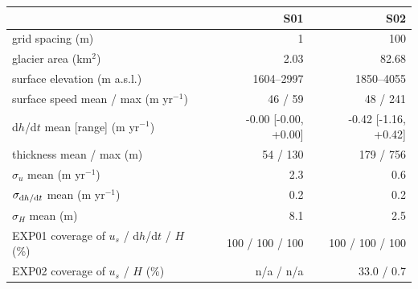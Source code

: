 \begin{tabular}{lrr}
\toprule
 & S01 & S02 \\
\midrule
grid spacing (m) & 1 & 100 \\
glacier area (km$^2$) & 2.03 & 82.68 \\
surface elevation (m a.s.l.) & 1604--2997 & 1850--4055 \\
surface speed mean / max (m yr$^{-1}$) & 46 / 59 & 48 / 241 \\
d$h$/d$t$ mean [range] (m yr$^{-1}$) & -0.00 [-0.00, +0.00] & -0.42 [-1.16, +0.42] \\
thickness mean / max (m) & 54 / 130 & 179 / 756 \\
$\sigma_{u}$ mean (m yr$^{-1}$) & 2.3 & 0.6 \\
$\sigma_{{\rm d}h/{\rm d}t}$ mean (m yr$^{-1}$) & 0.2 & 0.2 \\
$\sigma_{H}$ mean (m) & 8.1 & 2.5 \\
EXP01 coverage of $u_s$ / d$h$/d$t$ / $H$ (\%) & 100 / 100 / 100 & 100 / 100 / 100 \\
EXP02 coverage of $u_s$ / $H$ (\%) & n/a / n/a & 33.0 / 0.7 \\
\bottomrule
\end{tabular}
